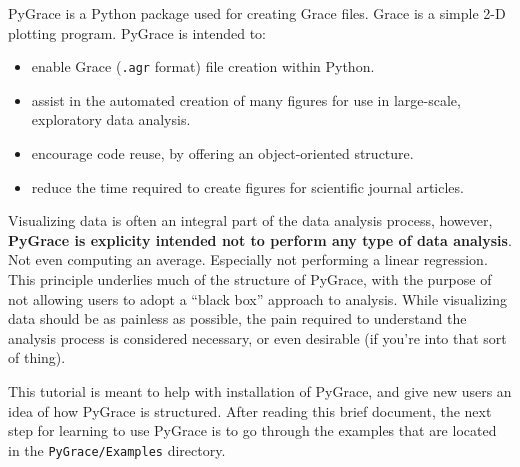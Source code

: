 PyGrace is a Python package used for creating Grace files. Grace is a
simple 2-D plotting program.  PyGrace is intended to:
\begin{itemize}
\item enable Grace ({\tt .agr} format) file creation within Python.
\item assist in the automated creation of many figures for use in
  large-scale, exploratory data analysis.
\item encourage code reuse, by offering an object-oriented structure.
\item reduce the time required to create figures for scientific
  journal articles.
\end{itemize}
Visualizing data is often an integral part of the data analysis
process, however, \textbf{PyGrace is explicity intended not to perform
  any type of data analysis}.  Not even computing an average.
Especially not performing a linear regression.  This principle
underlies much of the structure of PyGrace, with the purpose of not
allowing users to adopt a ``black box'' approach to analysis.  While
visualizing data should be as painless as possible, the pain required
to understand the analysis process is considered necessary, or even
desirable (if you're into that sort of thing).

This tutorial is meant to help with installation of PyGrace, and give
new users an idea of how PyGrace is structured.  After reading this
brief document, the next step for learning to use PyGrace is to go
through the examples that are located in the {\tt PyGrace/Examples}
directory.
